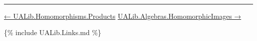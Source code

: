\begin{code}
\AgdaSpace{}%
\AgdaSymbol{=}\AgdaSpace{}%
\<%
\\
\>[0][@{}l@{\AgdaIndent{0}}]%
\>[1]\<%
\\
\>[1][@{}l@{\AgdaIndent{0}}]%
\>[2]\AgdaSpace{}%
\AgdaSymbol{:}\AgdaSpace{}%
\AgdaSpace{}%
\AgdaSpace{}%
\<%
\\
%
\>[2]\AgdaSpace{}%
\AgdaSymbol{=}\AgdaSpace{}%
\AgdaSpace{}%
\AgdaSpace{}%
\<%
\\
%
\>[2]\AgdaSpace{}%
\AgdaSymbol{:}\AgdaSpace{}%
\AgdaSpace{}%
\AgdaSpace{}%
\<%
\\
%
\>[2]\AgdaSpace{}%
\AgdaSymbol{=}\AgdaSpace{}%
\AgdaSpace{}%
\AgdaSpace{}%
\AgdaSpace{}%
\<%
\\
%
\\[\AgdaEmptyExtraSkip]%
%
\>[2]\AgdaSpace{}%
\AgdaSymbol{:}\AgdaSpace{}%
\AgdaSpace{}%
\AgdaSpace{}%
\AgdaSpace{}%
\<%
\\
%
\>[2]\AgdaSpace{}%
\AgdaSymbol{=}\AgdaSpace{}%
\AgdaSpace{}%
\AgdaSpace{}%
\AgdaSpace{}%
\AgdaOperator{\AgdaInductiveConstructor{,}}\AgdaSpace{}%
\AgdaSymbol{(}\AgdaSpace{}%
\AgdaSpace{}%
\AgdaSpace{}%
\AgdaSpace{}%
\AgdaSpace{}%
\AgdaOperator{\AgdaInductiveConstructor{,}}\AgdaSpace{}%
\AgdaSpace{}%
\AgdaSpace{}%
\AgdaSpace{}%
\AgdaSpace{}%
\AgdaSymbol{)}\<%
\\
%
\\[\AgdaEmptyExtraSkip]%
%
\>[2]\AgdaSpace{}%
\AgdaSymbol{:}\AgdaSpace{}%
\AgdaSpace{}%
\AgdaSpace{}%
\AgdaSpace{}%
\<%
\\
%
\>[2]\AgdaSpace{}%
\AgdaSymbol{=}\AgdaSpace{}%
\AgdaSpace{}%
\AgdaSpace{}%
\AgdaSpace{}%
\AgdaSpace{}%
\AgdaSymbol{(}\AgdaSpace{}%
\AgdaSpace{}%
\AgdaSpace{}%
\AgdaSpace{}%
\AgdaSymbol{)}\<%
\end{code}

\begin{center}\rule{0.5\linewidth}{\linethickness}\end{center}

\href{UALib.Homomorphisms.Products.html}{← UALib.Homomorphisms.Products}
{\href{UALib.Algebras.HomomorphicImages.html}{UALib.Algebras.HomomorphicImages
→}}

\{\% include UALib.Links.md \%\}
